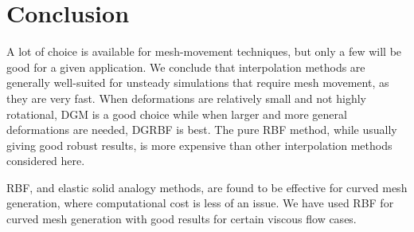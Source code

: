 \chapter{Conclusion}

A lot of choice is available for mesh-movement techniques, but only a few will be good for a given application. We conclude that interpolation methods are generally well-suited for unsteady simulations that require mesh movement, as they are very fast. When deformations are relatively small and not highly rotational, DGM is a good choice while when larger and more general deformations are needed, DGRBF is best. The pure RBF method, while usually giving good robust results, is more expensive than other interpolation methods considered here. 

RBF, and elastic solid analogy methods, are found to be effective for curved mesh generation, where computational cost is less of an issue. We have used RBF for curved mesh generation with good results for certain viscous flow cases. 
